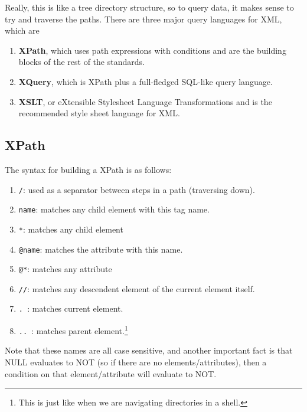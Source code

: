   Really, this is like a tree directory structure, so to query data, it makes sense to try and traverse the paths. There are three major query languages for XML, which are 
  \begin{enumerate}
    \item \textbf{XPath}, which uses path expressions with conditions and are the building blocks of the rest of the standards. 
    \item \textbf{XQuery}, which is XPath plus a full-fledged SQL-like query language. 
    \item \textbf{XSLT}, or eXtensible Stylesheet Language Transformations and is the recommended style sheet language for XML. 
  \end{enumerate}

\subsection{XPath}

  \begin{definition}
    \label{def:basic-xpath-constructs}
    The syntax for building a XPath is as follows: 
    \begin{enumerate}
      \item \texttt{/}: used as a separator between steps in a path (traversing down). 
      \item \texttt{name}: matches any child element with this tag name. 
      \item \texttt{*}: matches any child element 
      \item \texttt{@name}: matches the attribute with this name. 
      \item \texttt{@*}: matches any attribute 
      \item \texttt{//}: matches any descendent element of the current element itself. 
      \item \texttt{. }: matches current element.
      \item \texttt{.. }: matches parent element.\footnote{This is just like when we are navigating directories in a shell.}
    \end{enumerate}
    Note that these names are all case sensitive, and another important fact is that NULL evaluates to NOT (so if there are no elements/attributes), then a condition on that element/attribute will evaluate to NOT. 
  \end{definition}

